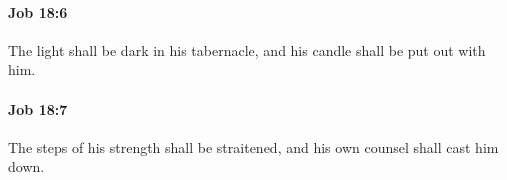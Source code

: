 		\paragraph{Job 18:6} %
			\label{JOB-18-6}

			The light shall be dark in his tabernacle, and his candle shall be put out with him.


		\paragraph{Job 18:7} %
			\label{JOB-18-7}

			The steps of his strength shall be straitened, and his own counsel shall cast him down.


